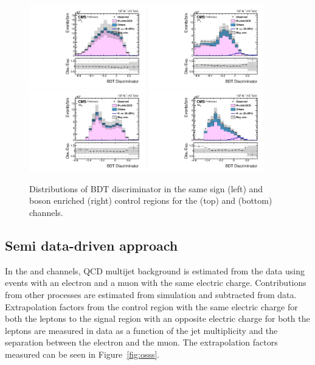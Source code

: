 \begin{figure}[htbp!]
  \centering
  \includegraphics[width=0.45\textwidth]{plots/chapter7/Fake/mutau/SSBDT.pdf}
  \includegraphics[width=0.45\textwidth]{plots/chapter7/Fake/mutau/WOSBDT.pdf}
  \includegraphics[width=0.45\textwidth]{plots/chapter7/Fake/etau/SSBDT.pdf}
  \includegraphics[width=0.45\textwidth]{plots/chapter7/Fake/etau/WOSBDT.pdf}
  \caption{Distributions of BDT discriminator in the same sign (left) and \PW boson enriched (right) control regions for the \muhad (top) and \ehad (bottom) channels.}
  \label{fig:fake_control_BDT}
\end{figure}

\subsection{Semi data-driven approach}
In the \emu and \mue channels, QCD multijet background is estimated from the data using events with an electron and a muon with the same electric charge. Contributions from other processes are estimated from simulation and subtracted from data. Extrapolation factors from the control region with the same electric charge for both the leptons to the signal region with an opposite electric charge for both the leptons are measured in data as a function of the jet multiplicity and the \dr separation between the electron and the muon. The extrapolation factors measured can be seen in Figure~\ref{fig:osss}.

